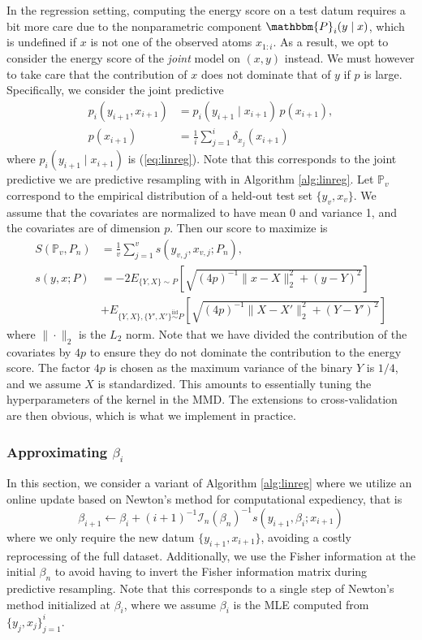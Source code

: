 \documentclass[11pt,a4paper]{article}
\newcommand{\iid}{\overset{\mathrm{iid}}{\sim}}
\theoremstyle{plain}
\theoremstyle{remark}
\theoremstyle{remark}
\begin{document}
In the regression setting, computing the energy score on a test datum requires a bit more care due to the nonparametric component $\mathbbm{P}_i(y \mid x)$, which is undefined if $x$ is not one of the observed atoms $x_{1:i}$. As a result, we opt to consider the energy score of the \textit{joint} model on $(x,y)$ instead. We must however to take care that the contribution of $x$ does not dominate that of $y$ if $p$ is large. Specifically, we consider the joint predictive
\begin{align*}
p_i(y_{i+1},x_{i+1})&= p_i(y_{i+1} \mid x_{i+1}) \, p(x_{i+1}),\\
p(x_{i+1}) &= \frac{1}{i}\sum_{j = 1}^i \delta_{x_j}(x_{i+1})
\end{align*}
where $p_i(y_{i+1} \mid x_{i+1})$ is (\ref{eq:linreg}). Note that this corresponds to the joint predictive we are predictive resampling with in Algorithm \ref{alg:linreg}. Let $\mathbb{P}_{v}$ correspond to the empirical distribution of a held-out test set $\{y_{v},x_{v}\}$. We assume that the covariates are normalized to have mean 0 and variance 1, and the covariates are of dimension $p$. Then our score to maximize is
\begin{align*}
    S(\mathbb{P}_{v}, P_n) &= \frac{1}{v}\sum_{j = 1}^v s(y_{v,j},x_{v,j}; P_n),\\
    s(y,x; P) &= - 2 E_{\{Y,X\} \sim P}\left[\sqrt{(4p)^{-1}\|x - X\|_2^2+ (y - Y)^2} \right] \\
    &+ E_{\{Y,X\}, \{Y',X'\} \iid P}\left[\sqrt{(4p)^{-1}\|X - X'\|_2^2+ (Y - Y')^2}\right]
\end{align*}
where $\|\cdot\|_2$ is the $L_2$ norm. Note that we have divided the contribution of the covariates by ${4p}$ to ensure they do not dominate the contribution to the energy score. The factor $4p$ is chosen as the maximum variance of the binary $Y$ is $1/4$, and we assume $X$ is standardized.
This amounts to essentially tuning the hyperparameters of the kernel in the MMD. The extensions to cross-validation are then obvious, which is what we implement in practice. 


\subsubsection{Approximating $\beta_i$}\label{sec:app_mle}



In this section, we consider a variant of Algorithm \ref{alg:linreg} where we utilize an online  update based on Newton's method for computational expediency, that is
$$
\beta_{i+1} \gets \beta_{i} + (i+1)^{-1}\mathcal{I}_n(\beta_n)^{-1}s(y_{i+1}, \beta_{i}; x_{i+1})
$$
where we only require the new datum $\{y_{i+1},x_{i+1}\}$, avoiding a costly reprocessing of the full dataset. Additionally, we use the Fisher information at the initial $\beta_n$ to avoid having to invert the Fisher information matrix during predictive resampling. Note that this corresponds to a single step of Newton's method initialized at $\beta_i$, where we assume $\beta_i$ is the MLE computed from $\{y_j,x_j\}_{j = 1}^i$.
\end{document}
